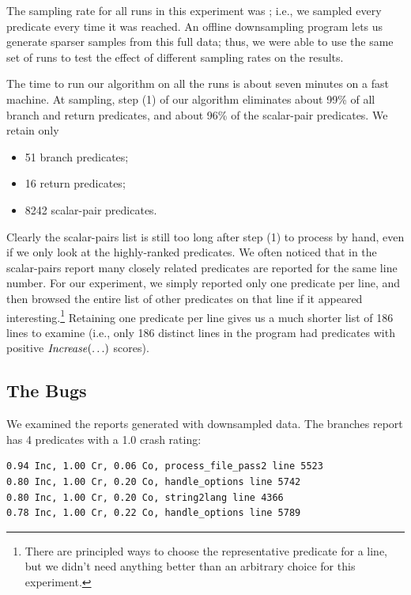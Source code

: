 The sampling rate for all runs in this experiment was ;
i.e., we sampled every predicate every time it was reached.  An
offline downsampling program lets us generate sparser samples from this
full data; thus, we were able to use the same set of runs to test the
effect of different sampling rates on the results.

The time to run our algorithm on all the runs is about seven minutes on
a fast machine.
At  sampling, step (1) of our algorithm eliminates about 99\% of
all branch and return predicates, and about 96\% of the scalar-pair
predicates.  We retain only
\begin{itemize}
\item 51 branch predicates;

\item 16 return predicates;

\item 8242 scalar-pair predicates.
\end{itemize}

Clearly the scalar-pairs list is still too long after step (1) to
process by hand, even if we only look at the highly-ranked predicates.
We often noticed that in the scalar-pairs report many closely related
predicates are reported for the same line number.  For our experiment,
we simply reported only one predicate per line, and then browsed the
entire list of other predicates on that line if it appeared
interesting.\footnote{There are principled ways to choose the
representative predicate for a line, but we didn't need anything
better than an arbitrary choice for this experiment.}  Retaining one
predicate per line gives us a much shorter list of 186 lines to
examine (i.e., only 186 distinct lines in the program had predicates
with positive $\mbox{\textit{Increase}}(\ldots)$ scores).

\subsection{The Bugs}

We examined the reports generated with  downsampled data.
The branches report has 4 predicates with a 1.0 crash rating:
\begin{small}
\begin{verbatim}
0.94 Inc, 1.00 Cr, 0.06 Co, process_file_pass2 line 5523
0.80 Inc, 1.00 Cr, 0.20 Co, handle_options line 5742
0.80 Inc, 1.00 Cr, 0.20 Co, string2lang line 4366
0.78 Inc, 1.00 Cr, 0.22 Co, handle_options line 5789
\end{verbatim}
\end{small}


